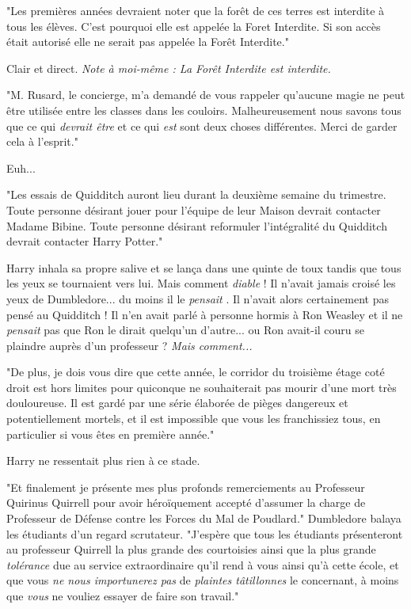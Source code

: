 "Les premières années devraient noter que la forêt de ces terres est interdite à tous les élèves. C'est pourquoi elle est appelée la Foret Interdite. Si son accès était autorisé elle ne serait pas appelée la Forêt Interdite."

Clair et direct. \emph{Note à moi-même : La Forêt Interdite est interdite.} 

"M. Rusard, le concierge, m'a demandé de vous rappeler qu'aucune magie ne peut être utilisée entre les classes dans les couloirs. Malheureusement nous savons tous que ce qui \emph{devrait être}  et ce qui \emph{est}  sont deux choses différentes. Merci de garder cela à l'esprit."

Euh...

"Les essais de Quidditch auront lieu durant la deuxième semaine du trimestre. Toute personne désirant jouer pour l'équipe de leur Maison devrait contacter Madame Bibine. Toute personne désirant reformuler l'intégralité du Quidditch devrait contacter Harry Potter."

Harry inhala sa propre salive et se lança dans une quinte de toux tandis que tous les yeux se tournaient vers lui. Mais comment \emph{diable}  ! Il n'avait jamais croisé les yeux de Dumbledore... du moins il le \emph{pensait} . Il n'avait alors certainement pas pensé au Quidditch ! Il n'en avait parlé à personne hormis à Ron Weasley et il ne \emph{pensait}  pas que Ron le dirait quelqu'un d'autre... ou Ron avait-il couru se plaindre auprès d'un professeur ? \emph{Mais comment...} 

"De plus, je dois vous dire que cette année, le corridor du troisième étage coté droit est hors limites pour quiconque ne souhaiterait pas mourir d'une mort très douloureuse. Il est gardé par une série élaborée de pièges dangereux et potentiellement mortels, et il est impossible que vous les franchissiez tous, en particulier si vous êtes en première année."

Harry ne ressentait plus rien à ce stade.

"Et finalement je présente mes plus profonds remerciements au Professeur Quirinus Quirrell pour avoir héroïquement accepté d'assumer la charge de Professeur de Défense contre les Forces du Mal de Poudlard." Dumbledore balaya les étudiants d'un regard scrutateur. "J'espère que tous les étudiants présenteront au professeur Quirrell la plus grande des courtoisies ainsi que la plus grande \emph{tolérance}  due au service extraordinaire qu'il rend à vous ainsi qu'à cette école, et que vous\emph{ ne nous importunerez pas } de \emph{plaintes tâtillonnes}  le concernant, à moins que \emph{vous}  ne vouliez essayer de faire son travail."

